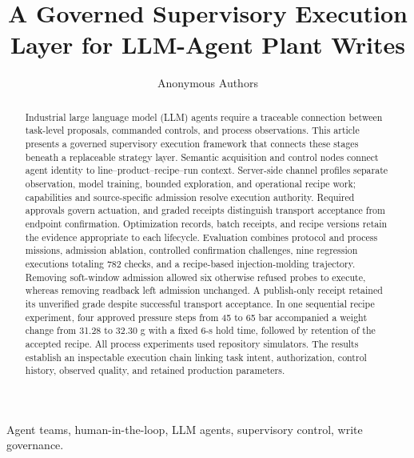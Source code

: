 \documentclass[journal]{IEEEtran}
\begin{document}

\title{A Governed Supervisory Execution Layer for LLM-Agent Plant Writes}

\author{Anonymous Authors}

\maketitle

\begin{abstract}
Industrial large language model (LLM) agents require a traceable connection
between task-level proposals, commanded controls, and process observations.
This article presents a governed supervisory execution framework that
connects these stages beneath a replaceable strategy layer. Semantic
acquisition and control nodes connect agent identity to
line--product--recipe--run context. Server-side channel profiles separate
observation, model training, bounded exploration, and operational recipe
work; capabilities and source-specific admission resolve execution
authority. Required approvals govern actuation, and graded receipts
distinguish transport acceptance from endpoint confirmation. Optimization
records, batch receipts, and recipe versions retain the evidence appropriate
to each lifecycle. Evaluation combines protocol and process missions,
admission ablation, controlled confirmation challenges, nine regression
executions totaling 782 checks, and a recipe-based injection-molding
trajectory. Removing soft-window admission allowed six otherwise refused
probes to execute, whereas removing readback left admission unchanged.
A publish-only receipt retained its unverified grade despite successful
transport acceptance. In one sequential recipe experiment, four approved
pressure steps from 45 to 65 bar accompanied a weight change from
31.28 to 32.30 g with a fixed 6-s hold time, followed by retention of the
accepted recipe. All process experiments used repository simulators.
The results establish an inspectable execution chain linking task intent,
authorization, control history, observed quality, and retained production
parameters.
\end{abstract}

\begin{IEEEkeywords}
Agent teams, human-in-the-loop, LLM agents, supervisory control, write
governance.
\end{IEEEkeywords}

\IEEEpeerreviewmaketitle





\FloatBarrier





\end{document}
